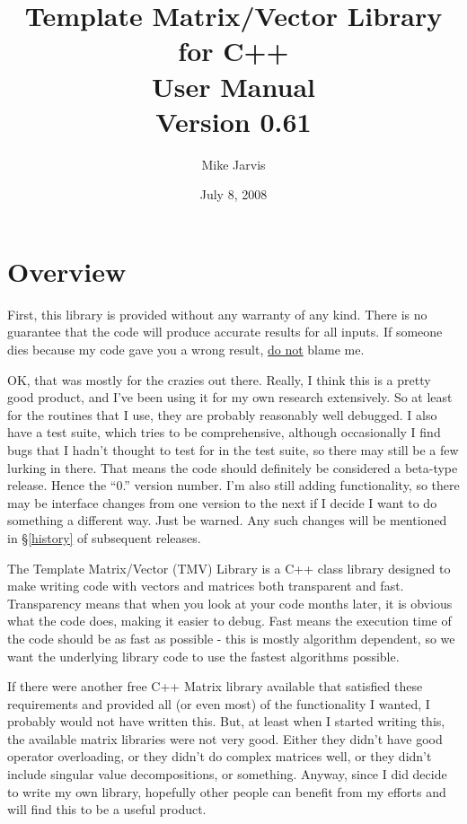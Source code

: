 \documentclass[twoside,letterpaper,11pt]{article}
\newcommand{\tmvversion}{0.61}
\begin{document}
\title{Template Matrix/Vector Library for C++ \\ User Manual \\ Version \tmvversion}
\author{Mike Jarvis}
\date{July 8, 2008}
\maketitle


\newpage
\section{Overview}

First, this library is provided without any warranty of any kind.  There is no guarantee
that the code will produce accurate results for all inputs.  If someone dies because
my code gave you a wrong result, \underline{do not} blame me.

OK, that was mostly for the crazies out there.  Really, I think this is a pretty good 
product, and I've been using it for my own research extensively.  So at least 
for the routines that I use, they are probably reasonably well debugged.
I also have a test suite, which tries to be comprehensive, although
occasionally I find bugs that I hadn't thought to test for in the test suite, so 
there may still be a few lurking in there.  That means the code should definitely be considered
a beta-type release.  Hence the ``0.'' version number.  I'm also still adding functionality,
so there may be interface changes from one version to the next if I decide I 
want to do something a different way.  Just be warned.  Any such changes will be 
mentioned in \S\ref{history} of subsequent releases.

The Template Matrix/Vector (TMV) Library is a C++ class library designed to make
writing code with vectors and matrices both transparent and fast.  Transparency 
means that when you look at your code months later, it is obvious what the code
does, making it easier to debug.  Fast means the execution time of the code should
be as fast as possible - this is mostly algorithm dependent, so we want the 
underlying library code to use the fastest algorithms possible.

If there were another free C++ Matrix library available that satisfied these requirements
and provided all (or even most) of the functionality I wanted, I probably would
not have written this.  But, at least when I started writing this, the available matrix libraries
were not very good.  Either they didn't have good operator overloading, or they 
didn't do complex matrices well, or they didn't include singular value decompositions,
or something.  Anyway, since I did decide to write 
my own library, hopefully other people can benefit from my efforts and will find 
this to be a useful product.
\end{document}

